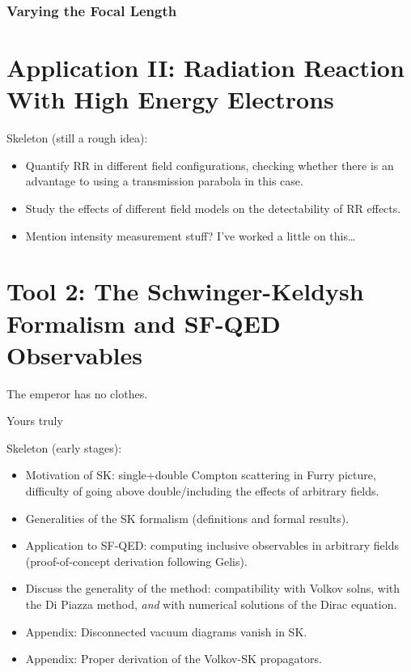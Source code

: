 \documentclass[11pt,SymmetricalJury]{inrsthesis/inrsthesis}
\begin{document}

\subsection{Varying the Focal Length}

\todo



\chapter{Application II: Radiation Reaction With High Energy Electrons}

Skeleton (still a rough idea):
  \begin{itemize}
    \item Quantify RR in different field configurations, checking whether there
          is an advantage to using a transmission parabola in this case.
    \item Study the effects of different field models on the detectability of
          RR effects.
    \item Mention intensity measurement stuff? I've worked a little on this\ldots
  \end{itemize}

\chapter{Tool 2: The Schwinger-Keldysh Formalism and SF-QED Observables}

\epigraph{The emperor has no clothes.}{Yours truly}


Skeleton (early stages):
  \begin{itemize}
      \item Motivation of SK: single+double Compton scattering in Furry picture,
            difficulty of going above double/including the effects of arbitrary fields.
      \item Generalities of the SK formalism (definitions and formal results).
      \item Application to SF-QED: computing inclusive observables in
            arbitrary fields (proof-of-concept derivation following Gelis).
      \item Discuss the generality of the method: compatibility with
            Volkov solns, with the Di Piazza method, \textit{and} with numerical
            solutions of the Dirac equation.
      \item Appendix: Disconnected vacuum diagrams vanish in SK.
      \item Appendix: Proper derivation of the Volkov-SK propagators.
  \end{itemize}
\end{document}
